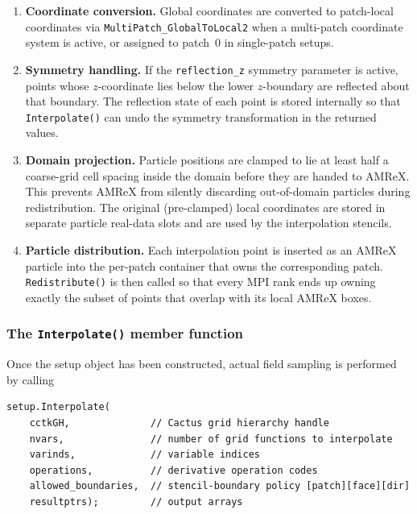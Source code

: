 \begin{enumerate}
  \item \textbf{Coordinate conversion.}  Global coordinates are converted to patch-local coordinates via \texttt{MultiPatch\_GlobalToLocal2} when a multi-patch coordinate system is active, or assigned to patch~0 in single-patch setups.

  \item \textbf{Symmetry handling.}  If the \texttt{reflection\_z} symmetry parameter is active, points whose $z$-coordinate lies below the lower $z$-boundary are reflected about that boundary. The reflection state of each point is stored internally so that \texttt{Interpolate()} can undo the symmetry transformation in the returned values.

  \item \textbf{Domain projection.}  Particle positions are clamped to lie at least half a coarse-grid cell spacing inside the domain before they are handed to AMReX. This prevents AMReX from silently discarding out-of-domain particles during redistribution. The original (pre-clamped) local coordinates are stored in separate particle real-data slots and are used by the interpolation stencils.

  \item \textbf{Particle distribution.}  Each interpolation point is inserted as an AMReX particle into the per-patch container that owns the corresponding patch. \texttt{Redistribute()} is then called so that every MPI rank ends up owning exactly the subset of points that overlap with its local AMReX boxes.
\end{enumerate}

\subsubsection{The \texttt{Interpolate()} member function}

Once the setup object has been constructed, actual field sampling is performed by calling

\begin{lstlisting}
setup.Interpolate(
    cctkGH,              // Cactus grid hierarchy handle
    nvars,               // number of grid functions to interpolate
    varinds,             // variable indices
    operations,          // derivative operation codes
    allowed_boundaries,  // stencil-boundary policy [patch][face][dir]
    resultptrs);         // output arrays
\end{lstlisting}


